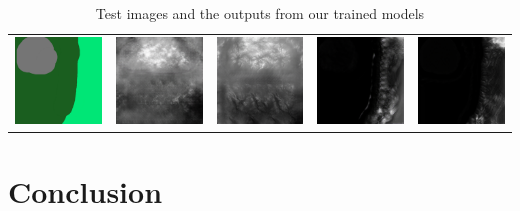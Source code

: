 \documentclass[twocolumn]{article}
\begin{document}
\begin{table}[t]
\begin{tabular}{c|c|c|c|c}
 				\includegraphics[width=0.25\columnwidth]{90.png} & \includegraphics[width=0.25\columnwidth]{91.png} & \includegraphics[width=0.25\columnwidth]{92.png} & \includegraphics[width=0.25\columnwidth]{93.png} & \includegraphics[width=0.25\columnwidth]{94.png} \\

		\end{tabular}
		
		\caption{Test images and the outputs from our trained models}
	\end{table}

	\section{Conclusion}
	
\end{document}
